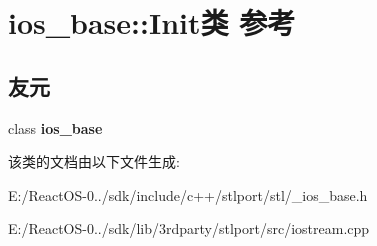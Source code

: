 \hypertarget{classios__base_1_1_init}{}\section{ios\+\_\+base\+:\+:Init类 参考}
\label{classios__base_1_1_init}
\subsection*{友元}
\begin{DoxyCompactItemize}
\item 
\mbox{\label{classios__base_1_1_init_ae00922dec509467af39af3a99a41cd52}} 
class {\bfseries ios\+\_\+base}
\end{DoxyCompactItemize}


该类的文档由以下文件生成\+:\begin{DoxyCompactItemize}
\item 
E\+:/\+React\+O\+S-\/0../sdk/include/c++/stlport/stl/\+\_\+ios\+\_\+base.\+h\item 
E\+:/\+React\+O\+S-\/0../sdk/lib/3rdparty/stlport/src/iostream.\+cpp\end{DoxyCompactItemize}
